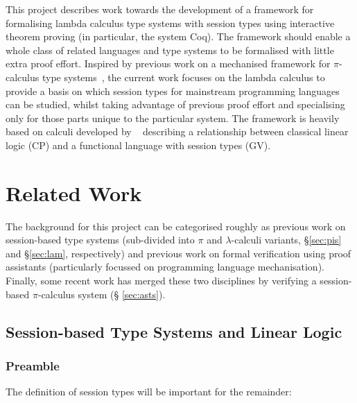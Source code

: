\documentclass{mpaper}
\begin{document}
This project describes work towards the development of a framework for
formalising lambda calculus type systems with session types using interactive
theorem proving (in particular, the system Coq). The framework should enable a
whole class of related languages and type systems to be formalised with little
extra proof effort. Inspired by previous work on a mechanised framework for
$\pi$-calculus type systems~\cite{Gay:2001:FFP}, the current work focuses on
the lambda calculus to provide a basis on which session types for mainstream
programming languages can be studied, whilst taking advantage of previous
proof effort and specialising only for those parts unique to the particular
system. The framework is heavily based on calculi developed by
\citeauthor{Wadler:2014}~\cite{Wadler:2014} describing a relationship between
classical linear logic (CP) and a functional language with session types (GV).

\section{Related Work}\label{sec:rw}

The background for this project can be categorised roughly as previous work on
session-based type systems (sub-divided into $\pi$ and $\lambda$-calculi
variants, \S \ref{sec:pis} and \S \ref{sec:lam}, respectively) and previous
work on formal verification using proof assistants (particularly focussed on
programming language mechanisation). Finally, some recent work has merged
these two disciplines by verifying a session-based $\pi$-calculus system (\S
\ref{sec:asts}).

\subsection{Session-based Type Systems and Linear Logic}\label{sec:sts}

\subsubsection{Preamble}\label{sec:pre}

The definition of session types will be important for the remainder:

\end{document}

